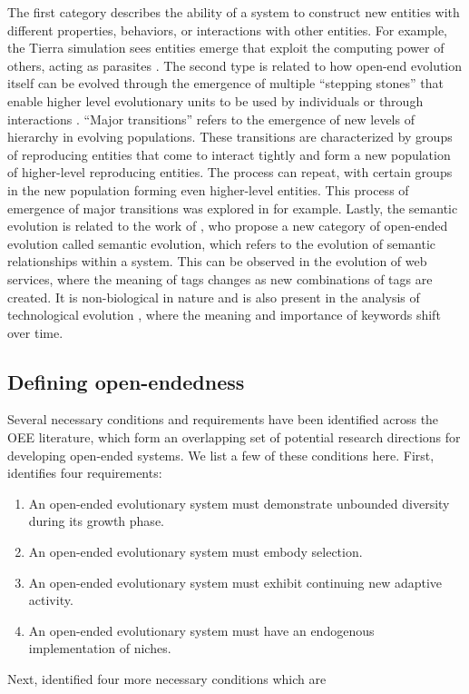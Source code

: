 The first category describes the ability of a system to construct new entities
with different properties, behaviors, or interactions with other entities. For
example, the Tierra simulation sees entities emerge that exploit the computing
power of others, acting as parasites \parencite{srayApproachSynthesisLife1991}.
The second type is related to how open-end evolution itself can be evolved
through the emergence of multiple ``stepping stones'' that enable higher level
evolutionary units to be used by individuals or through interactions
\parencite{patteeEvolvedOpenEndednessNot2019}. ``Major transitions'' refers to
the emergence of new levels of hierarchy in evolving populations. These
transitions are characterized by groups of reproducing entities that come to
interact tightly and form a new population of higher-level reproducing entities.
The process can repeat, with certain groups in the new population forming even
higher-level entities. This process of emergence of major transitions was
explored in \parencite{sayamaCardinalityLeapOpenEnded2019,
  morenoOpenEndedFraternalTransitions2019} for example. Lastly, the semantic
evolution is related to the work of
\textcite{ikegamiOpenEndedEvolutionMechanism2019}, who propose a new category of
open-ended evolution called semantic evolution, which refers to the evolution of
semantic relationships within a system. This can be observed in the evolution of
web services, where the meaning of tags changes as new combinations of tags are
created. It is non-biological in nature and is also present in the analysis of
technological evolution \parencite{bedauOpenEndedTechnologicalInnovation2019},
where the meaning and importance of keywords shift over time.

\subsection{Defining open-endedness}

Several necessary conditions and requirements have been identified across the
\ac{OEE} literature, which form an overlapping set of potential research
directions for developing open-ended systems. We list a few of these conditions
here. First, \textcite{maleyFourStepsOpenended1999} identifies four requirements:

\begin{enumerate}
  \item An open-ended evolutionary system must demonstrate unbounded diversity
        during its growth phase.
  \item An open-ended evolutionary system must embody selection.
  \item An open-ended evolutionary system must exhibit continuing new adaptive
        activity.
  \item An open-ended evolutionary system must have an endogenous implementation
        of niches.
\end{enumerate}
Next, \textcite{sorosIdentifyingNecessaryConditions2014} identified four more necessary
conditions which are

